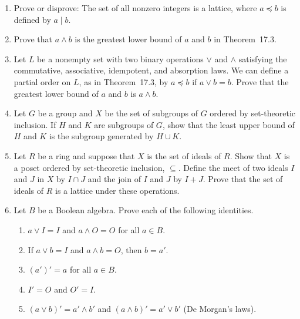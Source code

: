 {\begin{enumerate}
 
 
 
 
 
 
\bf\item\rm
Prove or disprove: The set of all nonzero integers is a lattice, where
$a \preceq b$ is defined by $a \mid b$.
 
 
\bf\item\rm
Prove that $a \wedge b$ is the greatest lower bound of $a$ and $b$ in
Theorem~17.3.
 
 
\bf\item\rm
Let $L$ be a nonempty set with two binary operations $\vee$ and
$\wedge$ satisfying the commutative, associative, idempotent, and  
absorption laws.  We can define a partial order on $L$, as in
Theorem~17.3, by $a \preceq b$ if $a \vee b = b$. Prove that the
greatest lower bound of $a$ and $b$ is $a \wedge b$.
 
 
\bf\item\rm
Let $G$ be a group and $X$ be the set of subgroups of $G$ ordered by
set-theoretic inclusion. If $H$ and $K$ are subgroups of $G$, show
that the least upper bound of $H$ and $K$ is the subgroup generated by
$H \cup K$. 
 
 
\bf\item\rm
Let $R$ be a ring and suppose that $X$ is the set of ideals of
$R$.  Show that $X$ is a poset ordered by set-theoretic inclusion,
$\subseteq$. Define the meet of two ideals $I$ and $J$ in $X$ by $I \cap
J$ and the join of $I$ and $J$ by $I + J$. Prove that the set of
ideals of $R$ is a lattice under these operations. 
 
 
\bf\item\rm
Let $B$ be a Boolean algebra. Prove each of the following identities.
\begin{enumerate}
 
 \bf\item\rm
$a \vee I = I$ and $a \wedge O = O$ for all $a \in B$. 
 
 \bf\item\rm
If $a \vee b = I$ and $a \wedge b = O$, then $b = a'$.
 
 \bf\item\rm
$(a')'=a$ for all $a \in B$.
 
 \bf\item\rm
$I' = O$ and $O' = I$.
 
 \bf\item\rm
$(a \vee b)' = a' \wedge b'$ and $(a \wedge b)' = a' \vee b'$ (De
Morgan's laws).
 

\end{enumerate}
\end{enumerate}}
